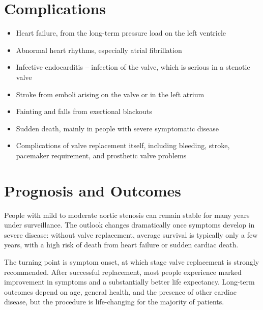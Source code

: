 \section*{Complications}
\begin{itemize}
    \item Heart failure, from the long-term pressure load on the left ventricle
    \item Abnormal heart rhythms, especially atrial fibrillation
    \item Infective endocarditis -- infection of the valve, which is serious in a stenotic valve
    \item Stroke from emboli arising on the valve or in the left atrium
    \item Fainting and falls from exertional blackouts
    \item Sudden death, mainly in people with severe symptomatic disease
    \item Complications of valve replacement itself, including bleeding, stroke, pacemaker requirement, and prosthetic valve problems
\end{itemize}

\section*{Prognosis and Outcomes}
People with mild to moderate aortic stenosis can remain stable for many years under surveillance. The outlook changes dramatically once symptoms develop in severe disease: without valve replacement, average survival is typically only a few years, with a high risk of death from heart failure or sudden cardiac death.

The turning point is symptom onset, at which stage valve replacement is strongly recommended. After successful replacement, most people experience marked improvement in symptoms and a substantially better life expectancy. Long-term outcomes depend on age, general health, and the presence of other cardiac disease, but the procedure is life-changing for the majority of patients.

